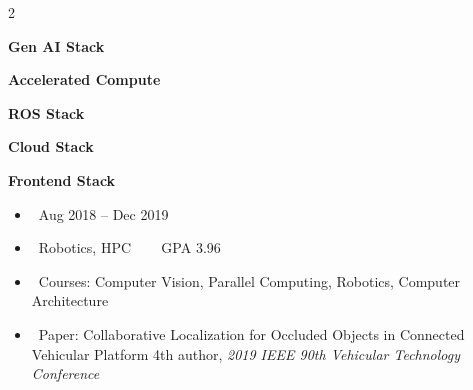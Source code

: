 \documentclass[10pt,letter,ragged2e,withhyper]{altacv}
\begin{document}
\begin{paracol}{2}






\switchcolumn


\textbf{Gen AI Stack}\\[3pt]

\divider

\textbf{Accelerated Compute}\\[3pt]
\break
{}

\divider

\textbf{ROS Stack}\\[3pt]

\divider

\textbf{Cloud Stack}\\[3pt]

\divider

\textbf{Frontend Stack}\\[3pt]


\begin{itemize}[leftmargin=1.8em, itemindent=-1.8em]
    \item[] \faCalendar ~Aug 2018 -- Dec 2019
    \item[] \faCrosshairs ~Robotics, HPC ~~~ \faStar GPA 3.96
    \item[] \faBook ~Courses:  Computer Vision, \break Parallel Computing, Robotics, \break Computer Architecture
    \item[] \faFile ~Paper: Collaborative Localization for Occluded Objects in Connected \break Vehicular Platform \break 4th author, \textit{2019 IEEE 90th \break Vehicular Technology Conference}
\end{itemize}
\divider
{}


\end{paracol}
\end{document}
